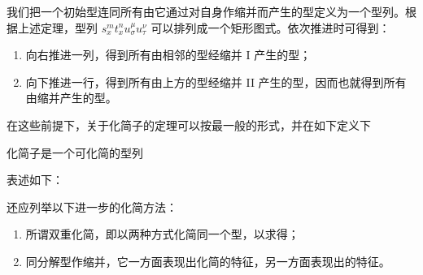 我们把一个初始型连同所有由它通过对自身作缩并而产生的型定义为一个\glqq{}型列\grqq{}。根据上述定理，型列 $s_x^m t_x^n u_\sigma^\mu u_\tau^\nu$ 可以排列成一个矩形图式。依次推进时可得到：
\begin{enumerate}
\item 向右推进一列，得到所有由相邻的型经缩并 I 产生的型；
\item 向下推进一行，得到所有由上方的型经缩并 II 产生的型，因而也就得到所有由缩并产生的型。
\end{enumerate}

在这些前提下，关于化简子的定理可以按最一般的形式，并在如下定义下
\begin{center}
\glqq{}化简子是一个可化简的型列\grqq{}
\end{center}
表述如下：

\begin{center}
\end{center}

还应列举以下进一步的化简方法：
\begin{enumerate}
\item 所谓\glqq{}双重化简\grqq{}，即以两种方式化简同一个型，以求得；
\item \glqq{}同分解型作缩并\grqq{}，它一方面表现出化简的特征，另一方面表现出的特征。
\end{enumerate}
